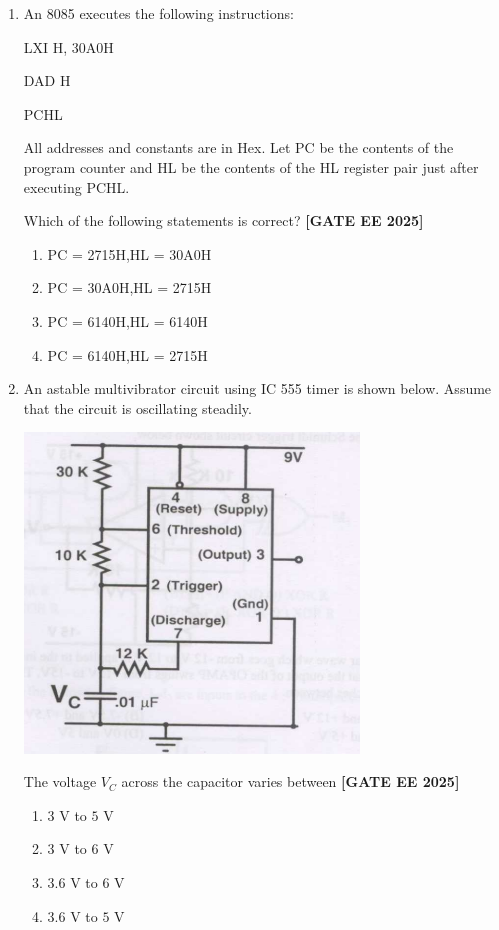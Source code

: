 \documentclass[12pt,a4paper]{article}
\begin{document}
\begin{enumerate}[leftmargin=*, label=\textbf{Q.\arabic*:}]
\item An 8085 executes the following instructions:

LXI H, 30A0H

DAD H

PCHL

All addresses and constants are in Hex. Let PC be the contents of the program counter and HL be the contents of the HL register pair just after executing PCHL.

Which of the following statements is correct?
\newline
\noindent \textbf{[GATE EE 2025]}
\begin{enumerate}[label=(\Alph*)]
  \item PC = 2715H,\quad HL = 30A0H
  \item PC = 30A0H,\quad HL = 2715H
  \item PC = 6140H,\quad HL = 6140H
  \item PC = 6140H,\quad HL = 2715H
\end{enumerate}

\item An astable multivibrator circuit using IC 555 timer is shown below. Assume that the circuit is oscillating steadily.

\begin{center}
\includegraphics[width=0.7\textwidth]{figs/q50.png}
\end{center}

The voltage $V_C$ across the capacitor varies between
\newline
\noindent \textbf{[GATE EE 2025]}
\begin{enumerate}[label=(\Alph*)]
    \item $3$ V to $5$ V
    \item $3$ V to $6$ V
    \item $3.6$ V to $6$ V
    \item $3.6$ V to $5$ V
\end{enumerate}


\end{enumerate}
\end{document}
